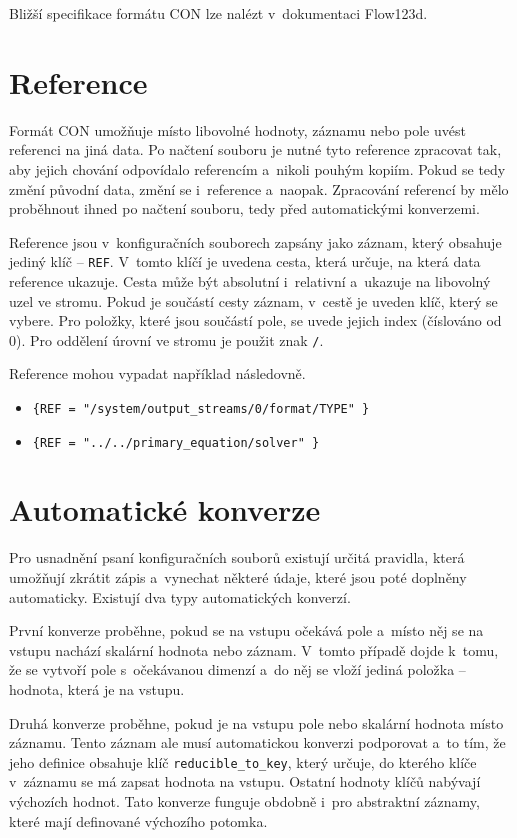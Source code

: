 \documentclass[FM,MP]{tulthesis}
\begin{document}
	Bližší specifikace formátu CON lze nalézt v~dokumentaci Flow123d\cite{bib:flow123d-manual}.


	\section{Reference}
		\label{reference}
		Formát CON umožňuje místo libovolné hodnoty, záznamu nebo pole uvést referenci na jiná data. Po načtení souboru je nutné tyto reference zpracovat tak, aby jejich chování odpovídalo referencím a~nikoli pouhým kopiím. Pokud se tedy změní původní data, změní se i~reference a~naopak. Zpracování referencí by mělo pro\-běhnout ihned po načtení souboru, tedy před automatickými konverzemi. 

		Reference jsou v~konfiguračních souborech zapsány jako záznam, který obsahuje jediný klíč -- \texttt{REF}. V~tomto klíčí je uvedena cesta, která určuje, na která data reference ukazuje. Cesta může být absolutní i~relativní a~ukazuje na libovolný uzel ve stromu. Pokud je součástí cesty záznam, v~cestě je uveden klíč, který se vybere. Pro položky, které jsou součástí pole, se uvede jejich index (číslováno od 0). Pro oddělení úrovní ve stromu je použit znak \texttt{/}. 

		Reference mohou vypadat například následovně.
			\begin{itemize}
				\item \texttt{\{REF = "/system/output\_streams/0/format/TYPE" \}}
				\item \texttt{\{REF = "../../primary\_equation/solver" \}}
			\end{itemize}


	\section{Automatické konverze}
		\label{automaticke-konverze}
		Pro usnadnění psaní konfiguračních souborů existují určitá pravidla, která umožňují zkrátit zápis a~vynechat některé údaje, které jsou poté doplněny automaticky. Existují dva typy automatických konverzí.

		První konverze proběhne, pokud se na vstupu očekává pole a~místo něj se na vstupu nachází skalární hodnota nebo záznam. V~tomto případě dojde k~tomu, že se vytvoří pole s~očekávanou dimenzí a~do něj se vloží jediná položka -- hodnota, která je na vstupu.

		Druhá konverze proběhne, pokud je na vstupu pole nebo skalární hodnota místo záznamu. Tento záznam ale musí automatickou konverzi podporovat a~to tím, že jeho definice obsahuje klíč \texttt{reducible\_to\_key}, který určuje, do kterého klíče v~záznamu se má zapsat hodnota na vstupu. Ostatní hodnoty klíčů nabývají výchozích hodnot. Tato konverze funguje obdobně i~pro abstraktní záznamy, které mají definované výchozího potomka. 
\end{document}
